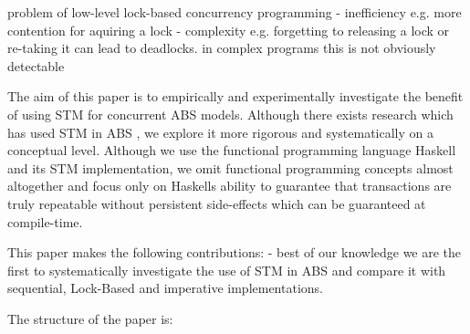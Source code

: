 problem of low-level lock-based concurrency programming
- inefficiency e.g. more contention for aquiring a lock
- complexity e.g. forgetting to releasing a lock or re-taking it can lead to deadlocks. in complex programs this is not obviously detectable

The aim of this paper is to empirically and experimentally investigate the benefit of using STM for concurrent ABS models. Although there exists research which has used STM in ABS \cite{bezirgiannis_improving_2013}, we explore it more rigorous and systematically on a conceptual level. Although we use the functional programming language Haskell and its STM implementation, we omit functional programming concepts almost altogether and focus only on Haskells ability to guarantee that transactions are truly repeatable without persistent side-effects which can be guaranteed at compile-time.

This paper makes the following contributions:
- best of our knowledge we are the first to systematically investigate the use of STM in ABS and compare it with sequential, Lock-Based and imperative implementations.

The structure of the paper is:
